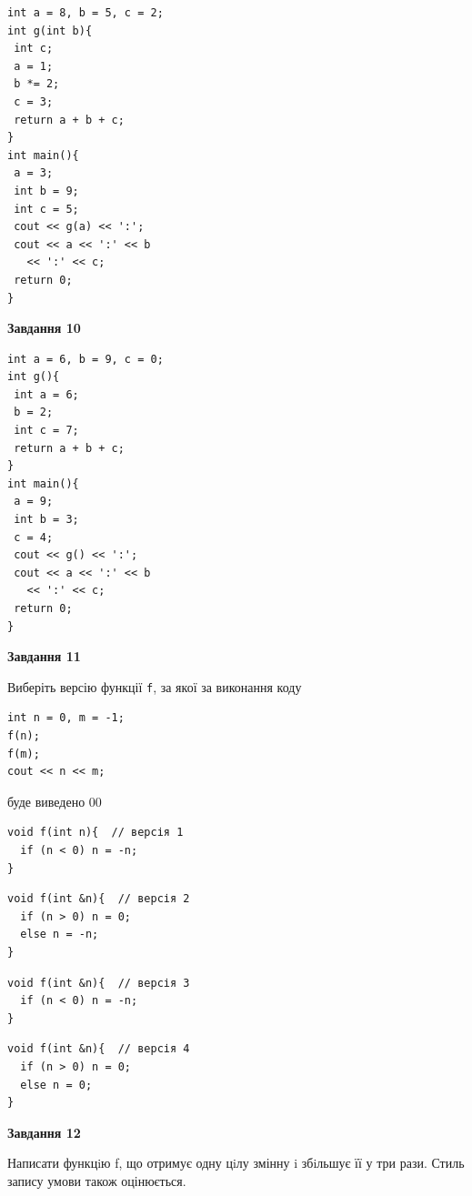 \documentclass[12pt, ukrainian]{article}
\def\code#1{\Verb!#1!}
\begin{document}
{\begin {large}
\begin{minipage}[t]{7.0cm}
\begin{verbatim}
int a = 8, b = 5, c = 2;
int g(int b){
 int c;
 a = 1;
 b *= 2;
 c = 3;
 return a + b + c;
}
int main(){
 a = 3;
 int b = 9;
 int c = 5;
 cout << g(a) << ':';
 cout << a << ':' << b 
   << ':' << c;
 return 0;
}
\end{verbatim}



\begin{center}
\textbf{Завдання 10}
\end{center}
\vspace{-8mm}

\begin{verbatim}
int a = 6, b = 9, c = 0;
int g(){
 int a = 6;
 b = 2;
 int c = 7;
 return a + b + c;
}
int main(){
 a = 9;
 int b = 3;
 c = 4;
 cout << g() << ':';
 cout << a << ':' << b 
   << ':' << c;
 return 0;
}
\end{verbatim}

\end{minipage}
\vline \hspace{1mm}
\begin{minipage}[t]{11.0cm}

\begin{center}
\textbf{Завдання 11}
\end{center}
Виберіть версію функції \code{f}, за якої за виконання коду
\begin{verbatim}
int n = 0, m = -1;
f(n);
f(m);
cout << n << m;
\end{verbatim}

буде виведено 00

\begin{verbatim}
void f(int n){  // версія 1
  if (n < 0) n = -n;
}
\end{verbatim}

\vspace{-8mm}\begin{verbatim}
void f(int &n){  // версія 2
  if (n > 0) n = 0;
  else n = -n;
}
\end{verbatim}

\vspace{-8mm}\begin{verbatim}
void f(int &n){  // версія 3
  if (n < 0) n = -n;
}
\end{verbatim}

\vspace{-8mm}\begin{verbatim}
void f(int &n){  // версія 4
  if (n > 0) n = 0;
  else n = 0;
}
\end{verbatim}



\begin{center}
\textbf{Завдання 12}
\end{center}

Написати функцiю f, що отримує одну цiлу змінну i збiльшує її у три рази. Стиль запису умови також оцінюється.\par

\end{minipage}

\end {large}}
\newpage
\end{document}
